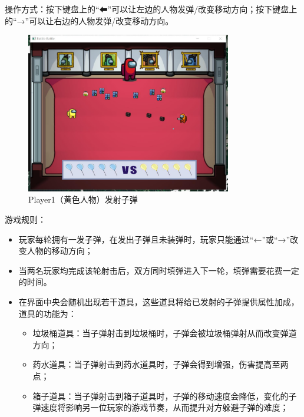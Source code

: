 \par
操作方式：按下键盘上的“⬅”可以让左边的人物发弹/改变移动方向；按下键盘上的“→”可以让右边的人物发弹/改变移动方向。
\par
\begin{figure}[htbp]
    \vspace{13pt} %
    \centering
    \includegraphics[width=0.8\textwidth]{images/4-12.jpg}
    \caption{Player1（黄色人物）发射子弹}%
\end{figure}
\par
游戏规则：
\begin{itemize}
    \item 玩家每轮拥有一发子弹，在发出子弹且未装弹时，玩家只能通过“←”或“→”改变人物的移动方向；
    \item 当两名玩家均完成该轮射击后，双方同时填弹进入下一轮，填弹需要花费一定的时间。
    \item 在界面中央会随机出现若干道具，这些道具将给已发射的子弹提供属性加成，道具的功能为：\begin{itemize}
        \item 垃圾桶道具：当子弹射击到垃圾桶时，子弹会被垃圾桶弹射从而改变弹道方向；
        \item 药水道具：当子弹射击到药水道具时，子弹会得到增强，伤害提高至两点；
        \item 箱子道具：当子弹射击到箱子道具时，子弹的移动速度会降低，变化的子弹速度将影响另一位玩家的游戏节奏，从而提升对方躲避子弹的难度；
    \end{itemize}
\end{itemize}
\par
